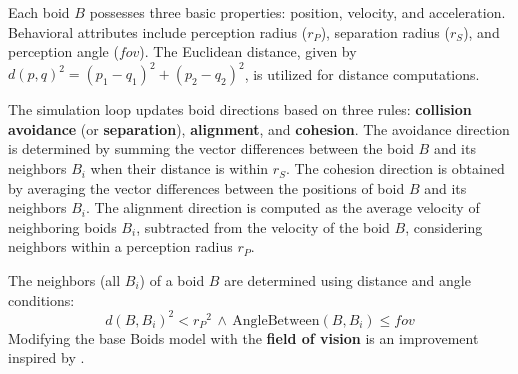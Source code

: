 \documentclass[9pt]{pnas-new}
\begin{document}
Each boid $B$ possesses three basic properties: position, velocity, and acceleration. Behavioral attributes include perception radius ($r_P$), separation radius ($r_S$), and perception angle ($fov$). The Euclidean distance, given by $d(p, q)^2 = (p_1-q_1)^2 + (p_2 - q_2)^2$, is utilized for distance computations.

The simulation loop updates boid directions based on three rules: \textbf{collision avoidance} (or \textbf{separation}), \textbf{alignment}, and \textbf{cohesion}. The avoidance direction is determined by summing the vector differences between the boid $B$ and its neighbors $B_i$ when their distance is within $r_S$. The cohesion direction is obtained by averaging the vector differences between the positions of boid $B$ and its neighbors $B_i$. The alignment direction is computed as the average velocity of neighboring boids $B_i$, subtracted from the velocity of the boid $B$, considering neighbors within a perception radius $r_P$.

The neighbors (all $B_i$) of a boid $B$ are determined using distance and angle conditions:
\begin{equation} \label{eq:neighbor_predicate}
    d(B, B_i)^2 < {r_P}^2 \, \land \, \text{AngleBetween}(B, B_i) \leq fov
\end{equation}
Modifying the base Boids model with the \textbf{field of vision} is an improvement inspired by \cite{JDemsar_predator_attacks}.
\end{document}
